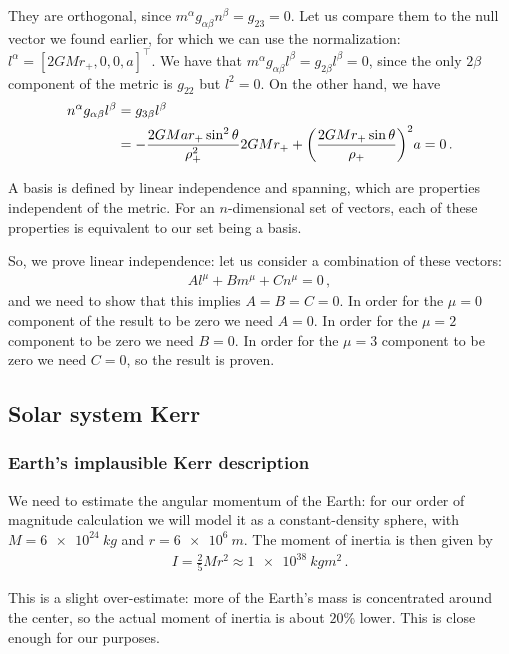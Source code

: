\documentclass[main.tex]{subfiles}
\begin{document}
They are orthogonal, since \(m^{\alpha } g_{\alpha \beta } n^{\beta } = g_{23} =0 \). 
Let us compare them to the null vector we found earlier, for which we can use the normalization: \(l^{\alpha } = [2GMr_{+}, 0, 0, a]^{\top}\). 
We have that \(m^{\alpha } g_{\alpha \beta } l^{\beta } = g_{2 \beta } l^{\beta }=  0\), since the only \(2 \beta \) component of the metric is \(g_{22 }\) but \(l^{2}=0\). On the other hand, we have 
%
\begin{align}
  n^{\alpha }g_{\alpha \beta } l^{\beta } 
  &= g_{3 \beta } l^{\beta } \\
  &= -\frac{ 2GMar_{+}\sin^2\theta }{\rho_{+}^2} 2GMr_{+}
  + \qty(\frac{2GMr_{+} \sin \theta }{\rho_{+}})^2 a = 0
\,.
\end{align}

A basis is defined by linear independence and spanning, which are properties independent of the metric. For an \(n\)-dimensional set of vectors, each of these properties is equivalent to our set being a basis.

So, we prove linear independence: let us consider a combination of these vectors: 
%
\begin{align}
  A l^{\mu } + B m^{\mu } + C n^{\mu } = 0
\,,
\end{align}
%
and we need to show that this implies \(A = B = C = 0\). 
In order for the \(\mu = 0\) component of the result to be zero we need \(A = 0\). In order for the \(\mu =2\) component to be zero we need \(B = 0\). In order for the \(\mu = 3\) component to be zero we need \(C = 0\), so the result is proven. 

\subsection{Solar system Kerr}

\subsubsection{Earth's implausible Kerr description}

We need to estimate the angular momentum of the Earth: for our order of magnitude calculation we will model it as a constant-density sphere, with \(M = \SI{6e+24}{kg}\) and \(r = \SI{6e6}{m}\). The moment of inertia is then given by 
%
\begin{align}
  I = \frac{2}{5} M r^{2} \approx \SI{1e38}{kg m^2}
\,.
\end{align}

This is a slight over-estimate: more of the Earth's mass is concentrated around the center, so the actual moment of inertia is about \(20\%\) lower. This is close enough for our purposes. 
\end{document}
